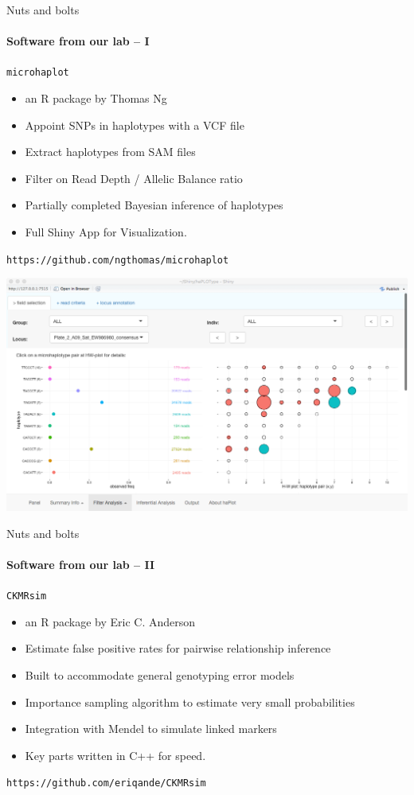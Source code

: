 \documentclass[letter,graphicx]{beamer}
\begin{document}
\begin{frame}{Nuts and bolts}
\framesubtitle{Software from our lab -- I}

{\tt {\Large microhaplot}} 
\begin{itemize}
\item an R package by Thomas Ng
\item Appoint SNPs in haplotypes with a VCF file
\item Extract haplotypes from SAM files
\item Filter on Read Depth / Allelic Balance ratio
\item Partially completed Bayesian inference of haplotypes
\item Full Shiny App for Visualization.
\end{itemize}

{\tt https://github.com/ngthomas/microhaplot}
\end{frame}


\newpage
\mbox{}
\vspace*{2em}
\mbox{}
\includegraphics[width=\textwidth]{mhap_figs/haplot2.png}



\begin{frame}{Nuts and bolts}
\framesubtitle{Software from our lab -- II}

{\tt\Large CKMRsim}
\begin{itemize}
\item an R package by Eric C. Anderson
\item Estimate false positive rates for pairwise relationship inference
\item Built to accommodate general genotyping error models
\item Importance sampling algorithm to estimate very small probabilities
\item Integration with Mendel to simulate linked markers
\item Key parts written in C++ for speed.
\end{itemize}

{\tt https://github.com/eriqande/CKMRsim}
\end{frame}
\end{document}
